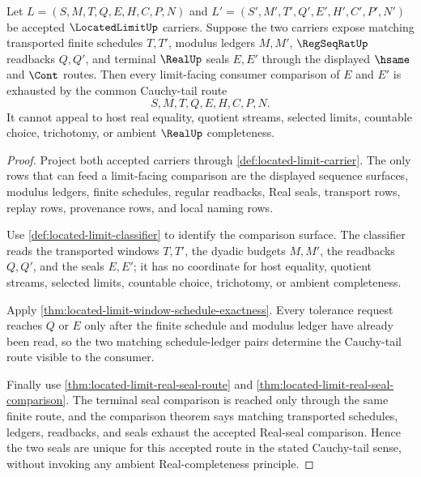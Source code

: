 \begin{theorem}
\label{thm:located-limit-cauchy-tail-uniqueness}
Let $L=(S,M,T,Q,E,H,C,P,N)$ and $L'=(S',M',T',Q',E',H',C',P',N')$ be accepted $\LocatedLimitUp$ carriers. Suppose the two carriers expose matching transported finite schedules $T,T'$, modulus ledgers $M,M'$, $\RegSeqRatUp$ readbacks $Q,Q'$, and terminal $\RealUp$ seals $E,E'$ through the displayed $\hsame$ and $\Cont$ routes. Then every limit-facing consumer comparison of $E$ and $E'$ is exhausted by the common Cauchy-tail route
$$
S,M,T,Q,E,H,C,P,N .
$$
It cannot appeal to host real equality, quotient streams, selected limits, countable choice, trichotomy, or ambient $\RealUp$ completeness.
\end{theorem}
\begin{proof}
Project both accepted carriers through \autoref{def:located-limit-carrier}. The only rows that can feed a limit-facing comparison are the displayed sequence surfaces, modulus ledgers, finite schedules, regular readbacks, Real seals, transport rows, replay rows, provenance rows, and local naming rows.

Use \autoref{def:located-limit-classifier} to identify the comparison surface. The classifier reads the transported windows $T,T'$, the dyadic budgets $M,M'$, the readbacks $Q,Q'$, and the seals $E,E'$; it has no coordinate for host equality, quotient streams, selected limits, countable choice, trichotomy, or ambient completeness.

Apply \autoref{thm:located-limit-window-schedule-exactness}. Every tolerance request reaches $Q$ or $E$ only after the finite schedule and modulus ledger have already been read, so the two matching schedule-ledger pairs determine the Cauchy-tail route visible to the consumer.

Finally use \autoref{thm:located-limit-real-seal-route} and \autoref{thm:located-limit-real-seal-comparison}. The terminal seal comparison is reached only through the same finite route, and the comparison theorem says matching transported schedules, ledgers, readbacks, and seals exhaust the accepted Real-seal comparison. Hence the two seals are unique for this accepted route in the stated Cauchy-tail sense, without invoking any ambient Real-completeness principle.
\end{proof}

